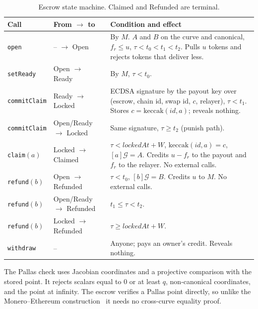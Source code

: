 \documentclass[10pt,letterpaper]{article}
\theoremstyle{plain}
\theoremstyle{definition}
\newcommand{\Gor}{\mathcal{G}}
\newcommand{\fn}[1]{\texttt{#1}}
\newcommand{\st}[1]{\textsf{#1}}
\begin{document}
\begin{table}[H]
\centering\small
\begin{tabularx}{\linewidth}{@{}l l X@{}}
\toprule
\textbf{Call} & \textbf{From} $\to$ \textbf{to} & \textbf{Condition and effect}\\
\midrule
\fn{open} & -- $\to$ \st{Open} & By $M$. $A$ and $B$ on the curve and canonical, $f_r \le u$, $\tau < t_0 < t_1 < t_2$. Pulls $u$ tokens and rejects tokens that deliver less.\\
\fn{setReady} & \st{Open} $\to$ \st{Ready} & By $M$, $\tau < t_0$.\\
\fn{commitClaim} & \st{Ready} $\to$ \st{Locked} & ECDSA signature by the payout key over (escrow, chain id, swap id, $c$, relayer), $\tau < t_1$. Stores $c = \mathrm{keccak}(\mathit{id}, a)$; reveals nothing.\\
\fn{commitClaim} & \st{Open}/\st{Ready} $\to$ \st{Locked} & Same signature, $\tau \ge t_2$ (punish path).\\
\fn{claim}$(a)$ & \st{Locked} $\to$ \st{Claimed} & $\tau < \mathit{lockedAt} + W$, $\mathrm{keccak}(\mathit{id},a)=c$, $[a]\Gor = A$. Credits $u-f_r$ to the payout and $f_r$ to the relayer. No external calls.\\
\fn{refund}$(b)$ & \st{Open} $\to$ \st{Refunded} & $\tau < t_0$, $[b]\Gor = B$. Credits $u$ to $M$. No external calls.\\
\fn{refund}$(b)$ & \st{Open}/\st{Ready} $\to$ \st{Refunded} & $t_1 \le \tau < t_2$.\\
\fn{refund}$(b)$ & \st{Locked} $\to$ \st{Refunded} & $\tau \ge \mathit{lockedAt} + W$.\\
\fn{withdraw} & -- & Anyone; pays an owner's credit. Reveals nothing.\\
\bottomrule
\end{tabularx}
\caption{Escrow state machine. \st{Claimed} and \st{Refunded} are terminal.}
\label{tab:fsm}
\end{table}

The Pallas check uses Jacobian coordinates and a projective comparison with the stored point. It
rejects scalars equal to $0$ or at least $q$, non-canonical coordinates, and the point at
infinity. The escrow verifies a Pallas point directly, so unlike the Monero--Ethereum
construction~\cite{athanor,mrl10} it needs no cross-curve equality proof.
\end{document}
